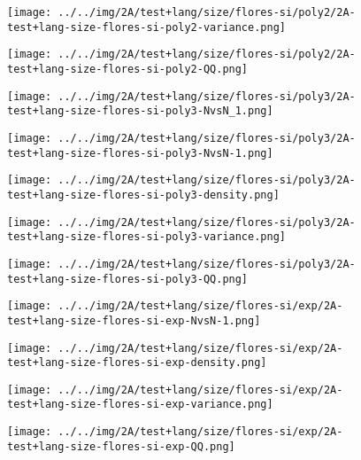 \begin{figure}[H]
\centering	\texttt{[image: ../../img/2A/test+lang/size/flores-si/poly2/2A-test+lang-size-flores-si-poly2-variance.png]}
\end{figure}
\begin{figure}[H]
\centering	\texttt{[image: ../../img/2A/test+lang/size/flores-si/poly2/2A-test+lang-size-flores-si-poly2-QQ.png]}
\end{figure}
\begin{figure}[H]
\centering	\texttt{[image: ../../img/2A/test+lang/size/flores-si/poly3/2A-test+lang-size-flores-si-poly3-NvsN\_1.png]}
\end{figure}
\begin{figure}[H]
\centering	\texttt{[image: ../../img/2A/test+lang/size/flores-si/poly3/2A-test+lang-size-flores-si-poly3-NvsN-1.png]}
\end{figure}
\begin{figure}[H]
\centering	\texttt{[image: ../../img/2A/test+lang/size/flores-si/poly3/2A-test+lang-size-flores-si-poly3-density.png]}
\end{figure}
\begin{figure}[H]
\centering	\texttt{[image: ../../img/2A/test+lang/size/flores-si/poly3/2A-test+lang-size-flores-si-poly3-variance.png]}
\end{figure}
\begin{figure}[H]
\centering	\texttt{[image: ../../img/2A/test+lang/size/flores-si/poly3/2A-test+lang-size-flores-si-poly3-QQ.png]}
\end{figure}
\begin{figure}[H]
\centering	\texttt{[image: ../../img/2A/test+lang/size/flores-si/exp/2A-test+lang-size-flores-si-exp-NvsN-1.png]}
\end{figure}
\begin{figure}[H]
\centering	\texttt{[image: ../../img/2A/test+lang/size/flores-si/exp/2A-test+lang-size-flores-si-exp-density.png]}
\end{figure}
\begin{figure}[H]
\centering	\texttt{[image: ../../img/2A/test+lang/size/flores-si/exp/2A-test+lang-size-flores-si-exp-variance.png]}
\end{figure}
\begin{figure}[H]
\centering	\texttt{[image: ../../img/2A/test+lang/size/flores-si/exp/2A-test+lang-size-flores-si-exp-QQ.png]}
\end{figure}
